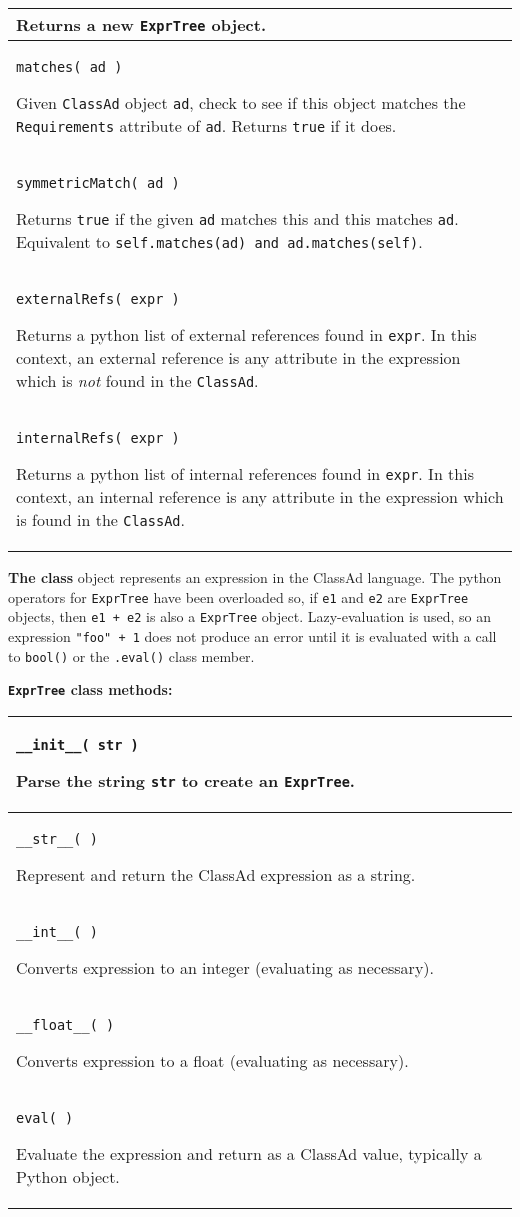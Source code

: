 \begin{flushleft}
\begin{longtable}{|p{16cm}|}
Returns a new \texttt{ExprTree} object.
\\ \hline
\texttt{matches( ad )}

Given \texttt{ClassAd} object \texttt{ad}, 
check to see if this object matches the \texttt{Requirements} attribute
of \texttt{ad}.
Returns \texttt{true} if it does.

\\ \hline
\texttt{symmetricMatch( ad )}

Returns \texttt{true} if the given \texttt{ad} matches this and this matches
\texttt{ad}.  Equivalent to \texttt{self.matches(ad) and ad.matches(self)}.

\\ \hline
\texttt{externalRefs( expr )}

Returns a python list of external references found in \texttt{expr}.  
In this context, 
an external reference is any attribute in the expression which is \emph{not}
found in the \texttt{ClassAd}.

\\ \hline
\texttt{internalRefs( expr )}

Returns a python list of internal references found in \texttt{expr}.  
In this context, 
an internal reference is any attribute in the expression which is
found in the \texttt{ClassAd}.
\\ \hline

\end{longtable}
\end{flushleft}


\textbf{The  class} object
represents an expression in the ClassAd language.  The python operators
for \texttt{ExprTree} have been overloaded so, if \texttt{e1} and \texttt{e2}
are \texttt{ExprTree} objects, then \texttt{e1 + e2} is also a \texttt{ExprTree}
object.  Lazy-evaluation is used, so an expression \texttt{"foo" + 1} does not
produce an error until it is evaluated with a call to \texttt{bool()} or the
\texttt{.eval()} class member.

\textbf{\texttt{ExprTree} class methods:}
\begin{flushleft}
\begin{longtable}{|p{16cm}|} \hline
\texttt{\_\_init\_\_( str )}

Parse the string \texttt{str} to create an \texttt{ExprTree}.
\\ \hline
\texttt{\_\_str\_\_( )}

Represent and return the ClassAd expression as a string.
\\ \hline
\texttt{\_\_int\_\_( )}

Converts expression to an integer (evaluating as necessary).
\\ \hline
\texttt{\_\_float\_\_( )}

Converts expression to a float (evaluating as necessary).
\\ \hline
\texttt{eval( )}

Evaluate the expression and return as a ClassAd value, 
typically a Python object.
\\ \hline
\end{longtable}
\end{flushleft}

